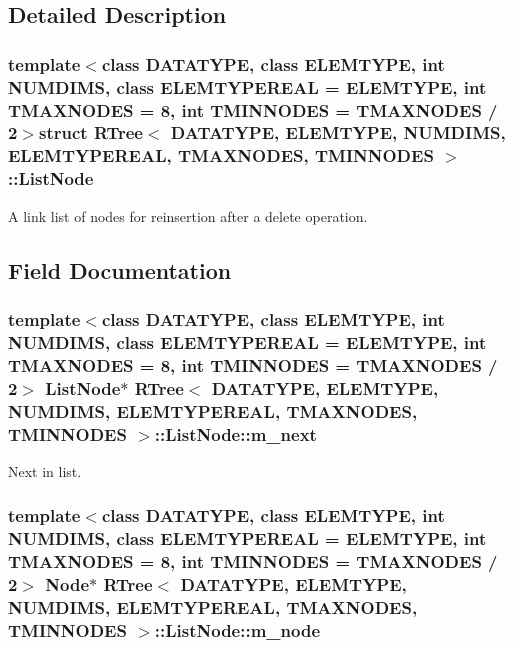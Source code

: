 \subsection{Detailed Description}
\subsubsection*{template$<$class D\-A\-T\-A\-T\-Y\-P\-E, class E\-L\-E\-M\-T\-Y\-P\-E, int N\-U\-M\-D\-I\-M\-S, class E\-L\-E\-M\-T\-Y\-P\-E\-R\-E\-A\-L = E\-L\-E\-M\-T\-Y\-P\-E, int T\-M\-A\-X\-N\-O\-D\-E\-S = 8, int T\-M\-I\-N\-N\-O\-D\-E\-S = T\-M\-A\-X\-N\-O\-D\-E\-S / 2$>$struct R\-Tree$<$ D\-A\-T\-A\-T\-Y\-P\-E, E\-L\-E\-M\-T\-Y\-P\-E, N\-U\-M\-D\-I\-M\-S, E\-L\-E\-M\-T\-Y\-P\-E\-R\-E\-A\-L, T\-M\-A\-X\-N\-O\-D\-E\-S, T\-M\-I\-N\-N\-O\-D\-E\-S $>$\-::\-List\-Node}

A link list of nodes for reinsertion after a delete operation. 

\subsection{Field Documentation}
\hypertarget{structRTree_1_1ListNode_a9812899d8953b03f1772522b668942e3}{
\subsubsection[{m\-\_\-next}]{\setlength{\rightskip}{0pt plus 5cm}template$<$class D\-A\-T\-A\-T\-Y\-P\-E, class E\-L\-E\-M\-T\-Y\-P\-E, int N\-U\-M\-D\-I\-M\-S, class E\-L\-E\-M\-T\-Y\-P\-E\-R\-E\-A\-L = E\-L\-E\-M\-T\-Y\-P\-E, int T\-M\-A\-X\-N\-O\-D\-E\-S = 8, int T\-M\-I\-N\-N\-O\-D\-E\-S = T\-M\-A\-X\-N\-O\-D\-E\-S / 2$>$ {\bf List\-Node}$\ast$ {\bf R\-Tree}$<$ D\-A\-T\-A\-T\-Y\-P\-E, E\-L\-E\-M\-T\-Y\-P\-E, N\-U\-M\-D\-I\-M\-S, E\-L\-E\-M\-T\-Y\-P\-E\-R\-E\-A\-L, T\-M\-A\-X\-N\-O\-D\-E\-S, T\-M\-I\-N\-N\-O\-D\-E\-S $>$\-::List\-Node\-::m\-\_\-next}}\label{structRTree_1_1ListNode_a9812899d8953b03f1772522b668942e3}


Next in list. 

\hypertarget{structRTree_1_1ListNode_ade4b7e322e04e0a71b4e14cde8e73dca}{
\subsubsection[{m\-\_\-node}]{\setlength{\rightskip}{0pt plus 5cm}template$<$class D\-A\-T\-A\-T\-Y\-P\-E, class E\-L\-E\-M\-T\-Y\-P\-E, int N\-U\-M\-D\-I\-M\-S, class E\-L\-E\-M\-T\-Y\-P\-E\-R\-E\-A\-L = E\-L\-E\-M\-T\-Y\-P\-E, int T\-M\-A\-X\-N\-O\-D\-E\-S = 8, int T\-M\-I\-N\-N\-O\-D\-E\-S = T\-M\-A\-X\-N\-O\-D\-E\-S / 2$>$ {\bf Node}$\ast$ {\bf R\-Tree}$<$ D\-A\-T\-A\-T\-Y\-P\-E, E\-L\-E\-M\-T\-Y\-P\-E, N\-U\-M\-D\-I\-M\-S, E\-L\-E\-M\-T\-Y\-P\-E\-R\-E\-A\-L, T\-M\-A\-X\-N\-O\-D\-E\-S, T\-M\-I\-N\-N\-O\-D\-E\-S $>$\-::List\-Node\-::m\-\_\-node}}\label{structRTree_1_1ListNode_ade4b7e322e04e0a71b4e14cde8e73dca}


